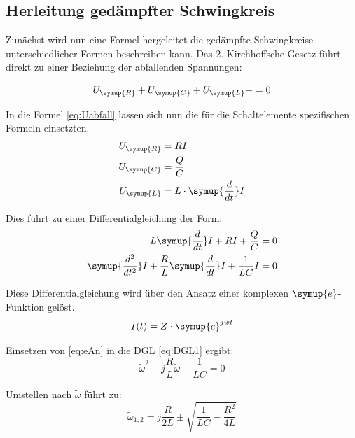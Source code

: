     
    \subsection{Herleitung gedämpfter Schwingkreis}

    
    \noindent Zunächst wird nun eine Formel hergeleitet die gedämpfte Schwingkreise unterschiedlicher Formen beschreiben kann.
    Das 2. Kirchhoffsche Gesetz führt direkt zu einer Beziehung der abfallenden Spannungen:

    \begin{equation}
    U_{\symup{R}} + U_{\symup{C}} + U_{\symup{L}} +  = 0     
    \label{eq:Uabfall}
    \end{equation}

    \noindent In die Formel \ref{eq:Uabfall} lassen sich nun die für die Schaltelemente spezifischen Formeln einsetzten.
    \begin{align}
        U_{\symup{R}} & = RI \nonumber\\
        U_{\symup{C}} & = \frac{Q}{C}\nonumber\\
        U_{\symup{L}} & = L \cdot \symup{\frac{d}{dt}}I \nonumber
    \end{align}

    \noindent Dies führt zu einer Differentialgleichung der Form:
    \begin{align}
        L  \symup{\frac{d}{dt}}I + RI + \frac{Q}{C} & = 0 \nonumber\\
        \symup{\frac{d^2}{dt^2}}I + \frac{R}{L} \symup{\frac{d}{dt}}I + \frac{1}{LC}I & = 0 
        \label{eq:DGL1}
    \end{align}
    
    \noindent Diese Differentialgleichung wird über den Ansatz einer komplexen $\symup{e}$-Funktion gelöst.
    \begin{equation}
        I(t) = Z \cdot \symup{e}^{j \tilde{w} t}
        \label{eq:eAn}
    \end{equation}

    \noindent Einsetzen von \ref{eq:eAn} in die DGL \ref{eq:DGL1} ergibt:
    \begin{equation}
        \tilde{\omega}^2 - j \frac{R}{L}\tilde{\omega} - \frac{1}{LC} = 0 \nonumber
    \end{equation}

    \noindent Umstellen nach $\tilde{\omega}$ führt zu:
    \begin{equation}
        \tilde{\omega}_{1,2} = j \frac{R}{2L} \pm \sqrt{\frac{1}{LC}-\frac{R^2}{4L}} \nonumber
    \end{equation}
    
